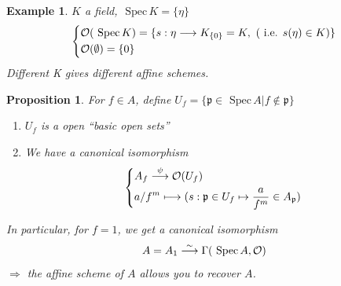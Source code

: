 \documentclass[11pt]{article}
\newtheorem{prop}[thm]{Proposition}
\newtheorem{ex}[thm]{Example}
\newcommand{\spec}{\text{ Spec}\,}
\newcommand{\scp}{{\mathfrak p}}
\newcommand{\calo}{{\cal O}}
\newcommand{\Lrta}{\Longrightarrow}
\newcommand{\lrta}{\longrightarrow}
\begin{document}
\begin{ex}
$K$ a field, $\spec K=\{\eta\}$
$$
\left\{
\begin{aligned}
&\calo(\spec K)=\{s:\eta\lrta K_{\{0\}}=K,\ (\text{ i.e. } s(\eta)\in K)\} \\
&\calo(\emptyset)=\{0\}
\end{aligned}
\right.
$$
Different K gives different affine schemes.
\end{ex}

\begin{prop}
For $f\in A$, define $U_f=\{\scp\in \spec A|f\notin \scp\}$
\begin{enumerate}[label=(\arabic*)]
	\item $U_f$ is a open ``basic open sets''
	\item We have a canonical isomorphism
	$$
	\left\{
	\begin{aligned}
	& A_f\overset{\psi}{\lrta}\calo(U_f)\\
	& a/f^m\longmapsto (s:\scp\in U_f\mapsto \frac{a}{f^m}\in A_\scp)
	\end{aligned}
	\right.
	$$
\end{enumerate}
In particular, for $f=1$, we get a canonical isomorphism
$$
A=A_1\overset{\sim}{\lrta}\Gamma(\spec A,\calo)
$$
$\Lrta$ the affine scheme of $A$ allows you to recover $A$.
\end{prop}
\end{document}
